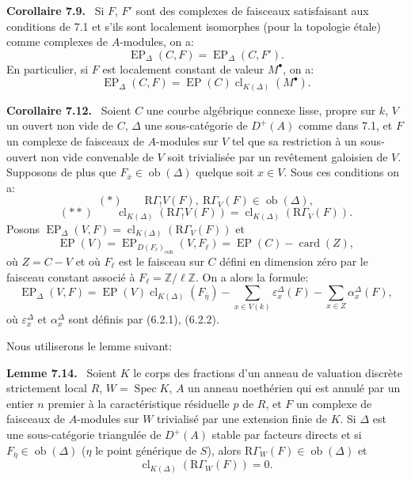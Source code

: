 \documentclass[11pt]{article}
\newenvironment{statement}[1]{\par\medskip\noindent\textbf{#1.}\ }{\par\medskip}
\DeclareMathOperator{\Spec}{Spec}
\providecommand{\EP}{\operatorname{EP}}
\providecommand{\coh}{\mathrm{coh}}
\providecommand{\Ob}{\operatorname{ob}}
\providecommand{\Ob}{\operatorname{ob}}
\providecommand{\Spec}{\operatorname{Spec}}
\providecommand{\EP}{\operatorname{EP}}
\providecommand{\Spec}{\operatorname{Spec}}
\providecommand{\Ob}{\operatorname{Ob}}
\providecommand{\coh}{\mathrm{coh}}
\providecommand{\clK}[1]{\operatorname{cl}_{K(#1)}}
\providecommand{\RG}{\mathrm R\Gamma}
\providecommand{\Spec}{\operatorname{Spec}}
\providecommand{\Ob}{\operatorname{ob}}
\begin{document}
\begin{statement}{Corollaire 7.9}
Si $F$, $F'$ sont des complexes de faisceaux satisfaisant aux conditions de 7.1 et s'ils sont localement isomorphes (pour la topologie étale) comme complexes de $A$-modules, on a:
\[
\EP_\Delta(C,F)=\EP_\Delta(C,F').
\tag{7.10}
\]
En particulier, si $F$ est localement constant de valeur $M^\bullet$, on a:
\[
\EP_\Delta(C,F)=\EP(C)\clK{\Delta}(M^\bullet).
\tag{7.11}
\]
\end{statement}

\begin{statement}{Corollaire 7.12}
Soient $C$ une courbe algébrique connexe lisse, propre sur $k$, $V$ un ouvert non vide de $C$, $\Delta$ une sous-catégorie de $D^+(A)$ comme dans 7.1, et $F$ un complexe de faisceaux de $A$-modules sur $V$ tel que sa restriction à un sous-ouvert non vide convenable de $V$ soit trivialisée par un revêtement galoisien de $V$. Supposons de plus que $F_{\bar x}\in\Ob(\Delta)$ quelque soit $x\in V$. Sous ces conditions on a:
\[
(*)\qquad \RG_!V(F),\ \RG_V(F)\in\Ob(\Delta),
\]
\[
(**)\qquad
\clK{\Delta}(\RG_!V(F))=\clK{\Delta}(\RG_V(F)).
\]
Posons $\EP_\Delta(V,F)=\clK{\Delta}(\RG_V(F))$ et
\[
\EP(V)=\EP_{D(F_\ell)_{\coh}}(V,F_\ell)=\EP(C)-\operatorname{card}(Z),
\]
où $Z=C-V$ et où $F_\ell$ est le faisceau sur $C$ défini en dimension zéro par le faisceau constant associé à $F_\ell=\mathbb Z/\ell\mathbb Z$. On a alors la formule:
\[
\EP_\Delta(V,F)
=
\EP(V)\clK{\Delta}(F_{\bar\eta})
-\sum_{x\in V(k)}\varepsilon_x^\Delta(F)
-\sum_{x\in Z}\alpha_x^\Delta(F),
\tag{7.13}
\]
où $\varepsilon_x^\Delta$ et $\alpha_x^\Delta$ sont définis par (6.2.1), (6.2.2).
\end{statement}

Nous utiliserons le lemme suivant:

\begin{statement}{Lemme 7.14}
Soient $K$ le corps des fractions d'un anneau de valuation discrète strictement local $R$, $W=\Spec K$, $A$ un anneau noethérien qui est annulé par un entier $n$ premier à la caractéristique résiduelle $p$ de $R$, et $F$ un complexe de faisceaux de $A$-modules sur $W$ trivialisé par une extension finie de $K$. Si $\Delta$ est une sous-catégorie triangulée de $D^+(A)$ stable par facteurs directs et si $F_{\bar\eta}\in\Ob(\Delta)$ ($\eta$ le point générique de $S$), alors $\RG_W(F)\in\Ob(\Delta)$ et
\[
\clK{\Delta}(\RG_W(F))=0.
\]
\end{statement}
\end{document}
